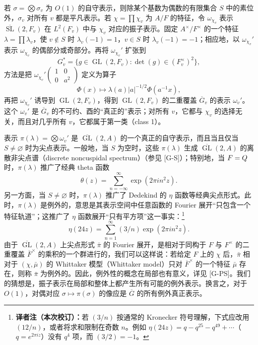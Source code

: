 若 $\sigma=\bigotimes\sigma_v$ 为 $O(1)$ 的自守表示，则除某个基数为偶数的有限集合 $S$ 中的素位外，$\sigma_v$ 对所有 $v$ 都是平凡表示。若 $\chi=\prod\chi_v$ 为 $A/F$ 的特征，令 $\omega_{\chi_v}$ 表示 $\overline{\operatorname{SL}}(2,F_v)$ 在 $L^2(F_v)$ 中与 $\chi_v$ 对应的振子表示。固定 $A^\times/F^\times$ 的一个特征 $\lambda=\prod\lambda_v$，使 $v\notin S$ 时 $\lambda_v(-1)=1$，$v\in S$ 时 $\lambda_v(-1)=-1$；相应地，以 $\omega_{\chi_v}'$ 表示 $\omega_{\chi_v}$ 的偶部分或奇部分。再将 $\omega_{\chi_v}'$ 扩张到
\[
 G_v^*=\{g\in\operatorname{GL}(2,F_v):\det(g)\in(F_v^\times)^2\},
\]
方法是把 $\omega_{\chi_v}'\!\left(\begin{smallmatrix}1&0\\0&a^2\end{smallmatrix}\right)$ 定义为算子
\[
 \Phi(x)\longmapsto\lambda(a)|a|^{-1/2}\Phi(a^{-1}x),
\]
再把 $\omega_{\chi_v}'$ 诱导到 $\operatorname{GL}(2,F_v)$，得到 $\operatorname{GL}(2,F_v)$ 的二重覆盖 $\overline G_v$ 的表示 $\omega_v'$。这个 $\omega_v'$ 是 $\overline G_v$ 的不可约、酉的“真正的”表示；对所有 $v$，它都与 $\chi_v$ 的选择无关，而且对几乎所有 $v$，它都属于第一类（class 1）。

表示 $\pi(\lambda)=\bigotimes\omega_v'$ 是 $\overline{\operatorname{GL}}(2,A)$ 的一个真正的自守表示，而且当且仅当 $S\ne\varnothing$ 时为尖点表示。一般地，当 $S$ 为空时，这些 $\pi(\lambda)$ 生成 $\overline{\operatorname{GL}}(2,A)$ 的离散非尖点谱（discrete noncuspidal spectrum）（参见 [G-S]）；特别地，当 $F=Q$ 时，$\pi(\lambda)$ 推广了经典 theta 函数
\[
 \theta(z)=\sum_{n=-\infty}^{\infty}\exp(2\pi i n^2z).
\]
另一方面，当 $S\ne\varnothing$ 时，$\pi(\lambda)$ 推广了 Dedekind 的 $\eta$ 函数等经典尖点形式。此时，$\pi(\lambda)$ 是例外的，意思是其表示空间中任意函数的 Fourier 展开“只包含一个特征轨道”；这推广了 $\eta$ 函数展开“只有平方项”这一事实：\footnote{\textbf{译者注（本次校订）：}若 $(3/n)$ 按通常的 Kronecker 符号理解，下式应改用 $(12/n)$，或者将求和限制在奇数 $n$。例如 $\eta(24z)=q-q^{25}-q^{49}+\cdots$（$q=e^{2\pi iz}$）没有 $q^4$ 项，而 $(3/2)=-1$。}
\[
 \eta(24z)=\sum_{n=1}^\infty(3/n)\exp(2\pi i n^2z).
\]
由于 $\overline{\operatorname{GL}}(2,A)$ 上尖点形式 $\bar\pi$ 的 Fourier 展开，是相对于同构于 $F$ 与 $F^\times$ 的二重覆盖 $\overline F^\times$ 的乘积的一个群进行的，我们可以这样说：若给定 $F$ 上的 $\chi$ 后，$\bar\pi$ 相对于 $(\chi,\bar\mu)$ 的 Whittaker 模型（Whittaker model）只对 $\overline F^\times$ 的一个特征 $\bar\mu$ 存在，则称 $\bar\pi$ 为例外的。因此，例外性的概念在局部也有意义，详见 [G-PS]。我们的猜想是，振子表示在局部和整体上都产生所有可能的例外表示。换言之，对于 $O(1)$，对偶对应 $\sigma\mapsto\pi(\sigma)$ 的像应是 $\overline G$ 的所有例外真正表示。

